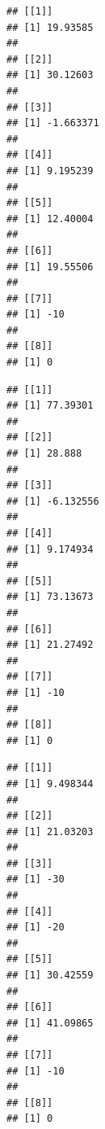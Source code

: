\documentclass[
]{article}
\newenvironment{Shaded}{\begin{snugshade}}{\end{snugshade}}
\newcommand{\ControlFlowTok}[1]{\textcolor[rgb]{0.13,0.29,0.53}{\textbf{#1}}}
\newcommand{\FunctionTok}[1]{\textcolor[rgb]{0.00,0.00,0.00}{#1}}
\newcommand{\NormalTok}[1]{#1}
\newcommand{\SpecialCharTok}[1]{\textcolor[rgb]{0.00,0.00,0.00}{#1}}
\newcommand{\StringTok}[1]{\textcolor[rgb]{0.31,0.60,0.02}{#1}}
\begin{document}
\begin{verbatim}
## [[1]]
## [1] 19.93585
## 
## [[2]]
## [1] 30.12603
## 
## [[3]]
## [1] -1.663371
## 
## [[4]]
## [1] 9.195239
## 
## [[5]]
## [1] 12.40004
## 
## [[6]]
## [1] 19.55506
## 
## [[7]]
## [1] -10
## 
## [[8]]
## [1] 0
\end{verbatim}

\begin{Shaded}
\end{Shaded}

\begin{verbatim}
## [[1]]
## [1] 77.39301
## 
## [[2]]
## [1] 28.888
## 
## [[3]]
## [1] -6.132556
## 
## [[4]]
## [1] 9.174934
## 
## [[5]]
## [1] 73.13673
## 
## [[6]]
## [1] 21.27492
## 
## [[7]]
## [1] -10
## 
## [[8]]
## [1] 0
\end{verbatim}

\begin{Shaded}
\end{Shaded}

\begin{verbatim}
## [[1]]
## [1] 9.498344
## 
## [[2]]
## [1] 21.03203
## 
## [[3]]
## [1] -30
## 
## [[4]]
## [1] -20
## 
## [[5]]
## [1] 30.42559
## 
## [[6]]
## [1] 41.09865
## 
## [[7]]
## [1] -10
## 
## [[8]]
## [1] 0
\end{verbatim}

\begin{Shaded}
\end{Shaded}
\end{document}
